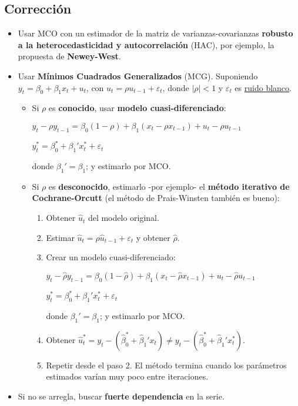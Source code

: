 \documentclass[10pt, a4paper, landscape]{extarticle}
\begin{document}
\begin{multicols}{3}
\subsection*{Corrección}

\begin{itemize}[leftmargin=*]
	\item Usar MCO con un estimador de la matriz de varianzas-covarianzas \textbf{robusto a la heterocedasticidad y autocorrelación} (HAC), por ejemplo, la propuesta de \textbf{Newey-West}.
	\item Usar \textbf{Mínimos Cuadrados Generalizados} (MCG). Suponiendo $y_t = \beta_0 + \beta_1 x_t + u_t$, con $u_t = \rho u_{t - 1} + \varepsilon_t$, donde $\lvert \rho \rvert < 1$ y $\varepsilon_t$ es \underline{ruido blanco}.
	\begin{itemize}[leftmargin=*]
		\item Si $\rho$ es \textbf{conocido}, usar \textbf{modelo cuasi-diferenciado}:
		\begin{center}
			$y_t - \rho y_{t - 1} = \beta_0 (1 - \rho) + \beta_1 (x_t - \rho x_{t - 1}) + u_t - \rho u_{t - 1}$
			
			$y_t^* = \beta_0^* + \beta_1' x_t^* + \varepsilon_t$
		\end{center}
		donde $\beta_1' = \beta_1$; y estimarlo por MCO.
		\item Si $\rho$ es \textbf{desconocido}, estimarlo -por ejemplo- el \textbf{método iterativo de Cochrane-Orcutt} (el método de Prais-Winsten también es bueno):
		\begin{enumerate}[leftmargin=*]
			\item Obtener $\hat{u}_t$ del modelo original.
			\item Estimar $\hat{u}_t = \rho \hat{u}_{t-1} + \varepsilon_t$ y obtener $\hat{\rho}$.
			\item Crear un modelo cuasi-diferenciado:
			\begin{center}
				$y_t - \hat{\rho} y_{t - 1} = \beta_0 (1 - \hat{\rho}) + \beta_1 (x_t - \hat{\rho} x_{t - 1}) + u_t - \hat{\rho} u_{t - 1}$
				
				$y_t^* = \beta_0^* + \beta_1' x_t^* + \varepsilon_t$
			\end{center}
			donde $\beta_1' = \beta_1$; y estimarlo por MCO.
			\item Obtener $\hat{u}_t^* = y_t - (\hat{\beta}_0^* + \hat{\beta}_1' x_t) \neq y_t - (\hat{\beta}_0^* + \hat{\beta}_1' x_t^*)$.
			\item Repetir desde el paso 2. El método termina cuando los parámetros estimados varían muy poco entre iteraciones.
		\end{enumerate}
	\end{itemize}
	\item Si no se arregla, buscar \textbf{fuerte dependencia} en la serie.
\end{itemize}


\end{multicols}
\end{document}
